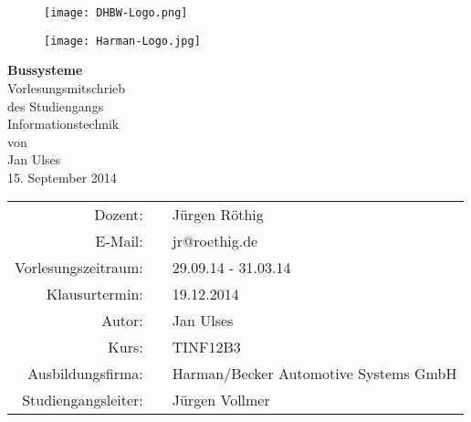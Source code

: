 \begin{titlepage}

  \onehalfspacing
  \begin{figure}[htbp]
    \begin{minipage}{0.4\textwidth}
     \centering
      \texttt{[image: DHBW-Logo.png]}
    \end{minipage}\hfill
    \begin{minipage}{0.4\textwidth}
     \centering
      \texttt{[image: Harman-Logo.jpg]}
    \end{minipage}
  \end{figure}

  \begin{center}	
	\vspace*{2,5cm}
    \huge
	\textbf{Bussysteme\\}
	\vspace*{2cm}
    \Large Vorlesungsmitschrieb\\
    \vspace*{0,5cm}
    \normalsize des Studiengangs\\
    \Large Informationstechnik\\
    \vspace*{0,75cm}
    \normalsize von\\
    \Large Jan Ulses\\
    \vspace*{0,75cm}
    \large 15. September 2014\\
    \vspace*{1,8cm}
    \small
    \renewcommand{\arraystretch}{1,2}
    \singlespacing
    \begin{tabular}{rcl}
    	\hline
  		Dozent: & & Jürgen Röthig\\
  		E-Mail: & & jr@roethig.de\\
  		Vorlesungszeitraum: & \hspace*{0,5mm} & 29.09.14 - 31.03.14 \\
  		Klausurtermin: & & 19.12.2014\\
  		Autor: & & Jan Ulses\\
  		Kurs: & & TINF12B3\\
  		Ausbildungsfirma: & & Harman/Becker Automotive Systems GmbH\\
  		Studiengangsleiter: & & Jürgen Vollmer\\
  		\hline
 	\end{tabular}
    
  \end{center}
  \normalsize
  \vfill
  
\end{titlepage}